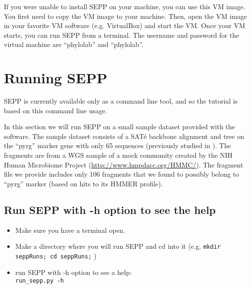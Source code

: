 \documentclass[11pt]{article} %
\newcommand{\sepp}{SEPP\xspace}
\newcommand{\ins}[1]{{\tt #1}}
\newcommand{\sate}{SAT\'{e}\xspace}
\begin{document}
If you were unable to install \sepp on your machine, you can use this VM image. You first need to copy the VM image to your machine. Then, open the VM image in your favorite VM software (e.g. VirtualBox) and start the VM. Once your VM starts, you can run \sepp from a terminal. The username and password for the virtual machine are ``phylolab'' and ``phylolab''.

\section{Running \sepp}
\sepp is currently available only as a command line tool, and
so the tutorial is based on this command line usage.

In this section we will run \sepp on a small sample dataset provided with the software. 
The sample dataset consists of a \sate backbone alignment and tree on the ``pyrg'' marker gene with only 65 sequences
(previously studied in \cite{metaphyler}). 
The fragments are from a WGS sample of a mock community created by the NIH Human Microbiome Project (\url{http://www.hmpdacc.org/HMMC/}).
The fragment file we provide includes only 106 fragments that we found to possibly belong to ``pyrg'' marker (based on hits to its HMMER profile).



\subsection{Run \sepp with -h option to see the help }

\begin{itemize}
\item Make sure you have a terminal open.
\item Make a directory where you will run \sepp and cd into it (e.g. \ins{mkdir seppRuns; cd seppRuns;} )
\item run \sepp with -h option to see a help:\\

\ins{run\_sepp.py -h}
\end{itemize}
\end{document}
